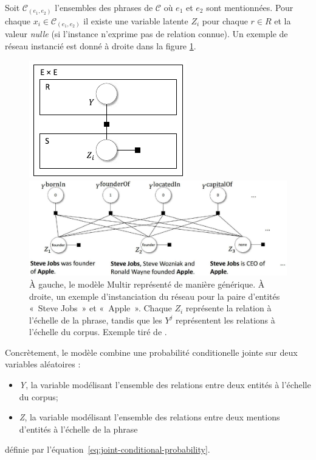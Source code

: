\documentclass[PhD-Yoann-Dupont.tex]{subfiles}
\begin{document}
Soit $\mathcal{C}_{(e_{1},e_{2})}$ l'ensembles des phrases de $\mathcal{C}$ où $e_{1}$ et $e_{2}$ sont mentionnées. Pour chaque $x_{i} \in \mathcal{C}_{(e_{1},e_{2})}$ il existe une variable latente $Z_{i}$ pour chaque $r \in R$ et la valeur \emph{nulle} (si l'instance n'exprime pas de relation connue). Un exemple de réseau instancié est donné à droite dans la figure \ref{fig:YZDependencies}.

\begin{figure}[ht!]
    \begin{minipage}{0.25\linewidth}
        \centering
        \includegraphics[scale=1.0]{images/multir/model}
    \end{minipage}
    \begin{minipage}{0.74\linewidth}
        \centering
        \includegraphics[scale=0.50]{images/multir/variableDependencies}
    \end{minipage}
\caption{À gauche, le modèle Multir représenté de manière générique. À droite, un exemple d'instanciation du réseau pour la paire d'entités «\ Steve Jobs\ » et «\ Apple\ ». Chaque $Z_{i}$ représente la relation à l'échelle de la phrase, tandis que les $Y^{j}$ représentent les relations à l'échelle du corpus. Exemple tiré de \citet{hoffmann2011knowledge}.}
\label{fig:YZDependencies}
\end{figure}

Concrètement, le modèle combine une probabilité conditionelle jointe sur deux variables aléatoires :
\begin{itemize}
\item \emph{Y}, la variable modélisant l'ensemble des relations entre deux entités à l'échelle du corpus;
\item \emph{Z}, la variable modélisant l'ensemble des relations entre deux mentions d'entités à l'échelle de la phrase
\end{itemize}
définie par l'équation\ \ref{eq:joint-conditional-probability}.
\end{document}
